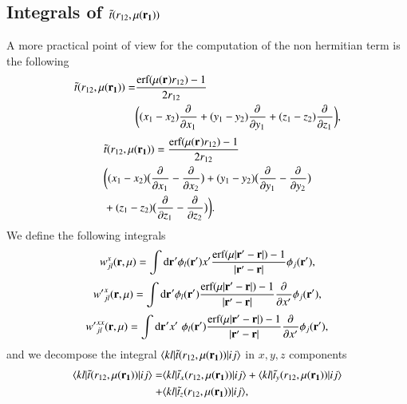 \documentclass[aip,jcp,reprint,noshowkeys,superscriptaddress]{revtex4-1}
\newcommand{\matelem}[3]{\langle #1 | #2 | #3 \rangle}
\newcommand{\deriv}[3]{\frac{\partial^{#3} #1}{\partial {#2}^{#3}}}
\newcommand{\br}[0]{{\bf {r}}}
\newcommand{\dr}[1]{\text{d}{\bf r_{#1}}}
\newcommand{\mur}[1]{\mu({\bf r_{#1}})}
\begin{document}
\subsection{Integrals of $\tilde{t}(r_{12},\mur{1})$}
A more practical point of view for the computation of the non hermitian term is the following 
\begin{equation}
 \begin{aligned}
 \tilde{t}(r_{12},\mur{1}) =& \frac{\text{erf}(\mur{} r_{12})-1}{2 r_{12}} \\ 
                           &\bigg( (x_1 - x_2) \deriv{}{x_1}{} + (y_1 - y_2) \deriv{}{y_1}{} + (z_1 - z_2) \deriv{}{z_1}{}\bigg),
 \end{aligned}
\end{equation}
\begin{equation}
 \begin{aligned}
 \label{def_non_hermit}
& \tilde{t}(r_{12},\mur{1})  = \frac{\text{erf}(\mur{} r_{12})-1}{2 r_{12}} \\
& \bigg( (x_1 - x_2) \big( \deriv{}{x_1}{} - \deriv{}{x_2}{} \big) +
         (y_1 - y_2) \big( \deriv{}{y_1}{} - \deriv{}{y_2}{} \big)  \\
&  +      (z_1 - z_2) \big( \deriv{}{z_1}{} - \deriv{}{z_2}{} \big)\bigg).                                                
 \end{aligned}
\end{equation}
We define the following integrals
\begin{equation}
 {w}_{jl}^{x}(\br,\mu) = \int \dr{}' \phi_l(\br') x' \frac{\text{erf}(\mu |\br' - \br| )-1}{|\br' - \br|} \phi_j(\br'),
\end{equation}
\begin{equation}
 {w'}_{jl}^{x}(\br,\mu) = \int \dr{}' \phi_l(\br') \frac{\text{erf}(\mu |\br' - \br| )-1}{|\br' - \br|}\deriv{}{x'}{} \phi_j(\br'),
\end{equation}
\begin{equation}
 {w'}_{jl}^{xx}(\br,\mu) = \int \dr{}' x' \, \,\phi_l(\br') \frac{\text{erf}(\mu |\br' - \br| )-1}{|\br' - \br|}\deriv{}{x'}{} \phi_j(\br'),
\end{equation}
and we decompose the integral $\matelem{kl}{\tilde{t}(r_{12},\mur{1})}{ij}$ in $x,y,z$ components 
\begin{equation}
 \begin{aligned}
  \matelem{kl}{\tilde{t}(r_{12},\mur{1})}{ij} =& \matelem{kl}{\tilde{t}_x(r_{12},\mur{1})}{ij} 
                                              + \matelem{kl}{\tilde{t}_y(r_{12},\mur{1})}{ij} \\
                                              +& \matelem{kl}{\tilde{t}_z(r_{12},\mur{1})}{ij},
 \end{aligned}
\end{equation}
\end{document}
